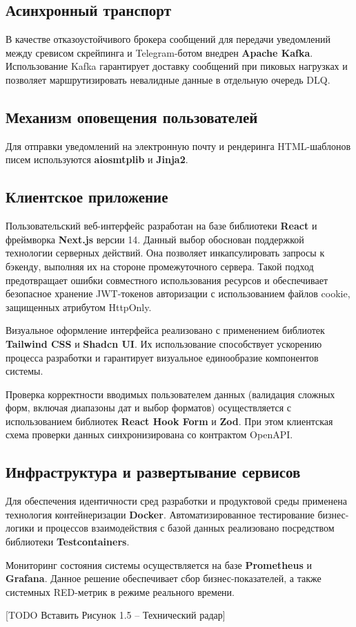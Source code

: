 \subsection*{Асинхронный транспорт}
В качестве отказоустойчивого брокера сообщений для передачи уведомлений между сревисом скрейпинга и Telegram-ботом внедрен \textbf{Apache Kafka}. 
Использование Kafka гарантирует доставку сообщений при пиковых нагрузках и позволяет маршрутизировать невалидные данные в отдельную очередь DLQ.

\subsection*{Механизм оповещения пользователей}
Для отправки уведомлений на электронную почту и рендеринга HTML-шаблонов писем используются \textbf{aiosmtplib} и \textbf{Jinja2}.

\subsection*{Клиентское приложение}
Пользовательский веб-интерфейс разработан на базе библиотеки \textbf{React} и фреймворка \textbf{Next.js} версии 14. 
Данный выбор обоснован поддержкой технологии серверных действий. 
Она позволяет инкапсулировать запросы к бэкенду, выполняя их на стороне промежуточного сервера. 
Такой подход предотвращает ошибки совместного использования ресурсов и обеспечивает безопасное хранение JWT-токенов авторизации с использованием файлов cookie, защищенных атрибутом HttpOnly.

Визуальное оформление интерфейса реализовано с применением библиотек \textbf{Tailwind CSS} и \textbf{Shadcn UI}.
Их использование способствует ускорению процесса разработки и гарантирует визуальное единообразие компонентов системы.

Проверка корректности вводимых пользователем данных (валидация сложных форм, включая диапазоны дат и выбор форматов) осуществляется с использованием библиотек \textbf{React Hook Form} и \textbf{Zod}. 
При этом клиентская схема проверки данных синхронизирована со контрактом OpenAPI.

\subsection*{Инфраструктура и развертывание сервисов}
Для обеспечения идентичности сред разработки и продуктовой среды применена технология контейнеризации \textbf{Docker}. 
Автоматизированное тестирование бизнес-логики и процессов взаимодействия с базой данных реализовано посредством библиотеки \textbf{Testcontainers}.

Мониторинг состояния системы осуществляется на базе \textbf{Prometheus} и \textbf{Grafana}. 
Данное решение обеспечивает сбор бизнес-показателей, а также системных RED-метрик в режиме реального времени.


[TODO Вставить Рисунок 1.5 -- Технический радар]